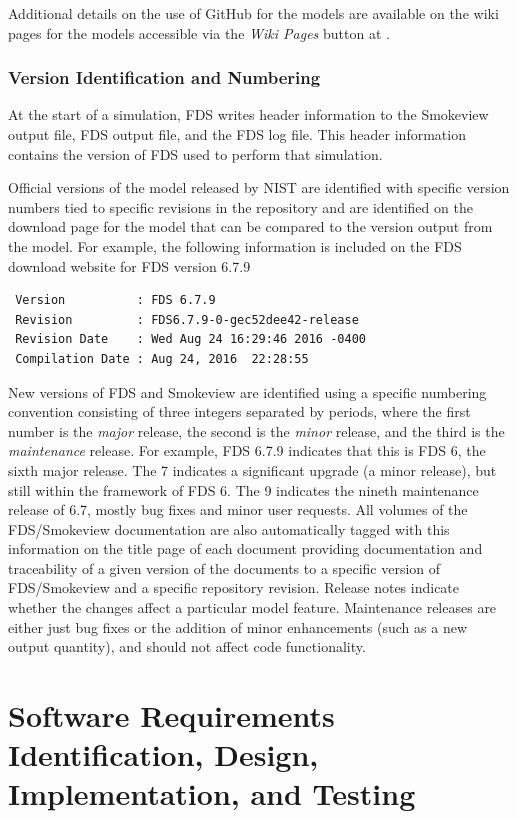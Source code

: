 \documentclass[11pt]{book}
\begin{document}
Additional details on the use of GitHub for the models are available on the wiki pages for the models accessible via the \emph{Wiki Pages} button at \href{https://pages.nist.gov/fds/} {}.

\subsection{Version Identification and Numbering}

At the start of a simulation, FDS writes header information to the Smokeview output file, FDS output file, and the FDS log file.  This header information contains the version of FDS used to perform that simulation.

Official versions of the model released by NIST are identified with specific version numbers tied to specific revisions in the repository and are identified on the download page for the model that can be compared to the version output from the model. For example, the following information is included on the FDS download website for FDS version 6.7.9
\begin{lstlisting}
 Version          : FDS 6.7.9
 Revision         : FDS6.7.9-0-gec52dee42-release
 Revision Date    : Wed Aug 24 16:29:46 2016 -0400
 Compilation Date : Aug 24, 2016  22:28:55
\end{lstlisting}
New versions of FDS and Smokeview are identified using a specific numbering convention consisting of three integers separated by periods, where the first number is the {\em major} release, the second is the {\em minor} release, and the third is the {\em maintenance} release. For example, FDS 6.7.9 indicates that this is FDS 6, the sixth major release. The 7 indicates a significant upgrade (a minor release), but still within the framework of FDS 6.  The 9 indicates the nineth maintenance release of 6.7, mostly bug fixes and minor user requests. All volumes of the FDS/Smokeview documentation are also automatically tagged with this information on the title page of each document providing documentation and traceability of a given version of the documents to a specific version of FDS/Smokeview and a specific repository revision. Release notes indicate whether the changes affect a particular model feature. Maintenance releases are either just bug fixes or the addition of minor enhancements (such as a new output quantity), and should not affect code functionality.



\chapter{Software Requirements Identification, Design, Implementation, and Testing}
\end{document}
